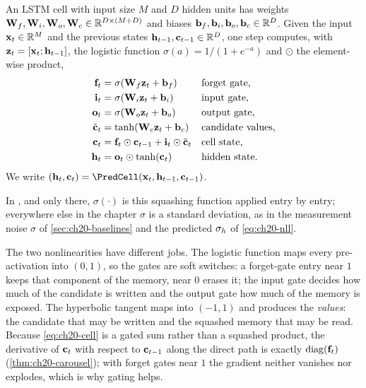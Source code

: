 \begin{definition}
\label{def:ch20-lstm}
An LSTM cell with input size $M$ and $D$ hidden units has weights
$\mathbf{W}_f, \mathbf{W}_i, \mathbf{W}_o, \mathbf{W}_c \in \mathbb{R}^{D \times (M + D)}$ and
biases $\mathbf{b}_f, \mathbf{b}_i, \mathbf{b}_o, \mathbf{b}_c \in \mathbb{R}^D$. Given the
input $\mathbf{x}_t \in \mathbb{R}^M$ and the previous states $\mathbf{h}_{t-1}, \mathbf{c}_{t-1}
\in \mathbb{R}^D$, one step computes, with $\mathbf{z}_t = [\mathbf{x}_t; \mathbf{h}_{t-1}]$,
the logistic function $\sigma(a) = 1/(1 + e^{-a})$ and $\odot$ the
element-wise product,
\begin{align}
  \vect{f}_t &= \sigma(\mat{W}_f \vect{z}_t + \vect{b}_f) && \text{forget gate,}\index{LSTM (long short-term memory)!gates} \label{eq:ch20-forget}\\
  \vect{i}_t &= \sigma(\mat{W}_i \vect{z}_t + \vect{b}_i) && \text{input gate,} \label{eq:ch20-input}\\
  \vect{o}_t &= \sigma(\mat{W}_o \vect{z}_t + \vect{b}_o) && \text{output gate,} \label{eq:ch20-output}\\
  \tilde{\vect{c}}_t &= \tanh(\mat{W}_c \vect{z}_t + \vect{b}_c) && \text{candidate values,} \label{eq:ch20-candidate}\\
  \vect{c}_t &= \vect{f}_t \odot \vect{c}_{t-1} + \vect{i}_t \odot \tilde{\vect{c}}_t && \text{cell state,} \label{eq:ch20-cell}\\
  \vect{h}_t &= \vect{o}_t \odot \tanh(\vect{c}_t) && \text{hidden state.} \label{eq:ch20-hidden}
\end{align}
We write $(\vect{h}_t, \vect{c}_t) = \PredCell(\vect{x}_t, \vect{h}_{t-1}, \vect{c}_{t-1})$.
\end{definition}

In , and only there, $\sigma(\cdot)$
is this squashing function applied entry by entry; everywhere else in the
chapter $\sigma$ is a standard deviation, as in the measurement noise
$\sigma$ of \cref{sec:ch20-baselines} and the predicted $\mathbf{\sigma}_h$ of
\cref{eq:ch20-nll}.

The two nonlinearities have different jobs. The logistic function maps every
pre-activation into $(0, 1)$, so the gates are soft switches: a forget-gate
entry near $1$ keeps that component of the memory, near $0$ erases it; the
input gate decides how much of the candidate is written and the output gate
how much of the memory is exposed. The hyperbolic tangent maps into
$(-1, 1)$ and produces the \emph{values}: the candidate that may be written
and the squashed memory that may be read. Because \cref{eq:ch20-cell} is a
gated sum rather than a squashed product, the derivative of $\mathbf{c}_t$ with
respect to $\mathbf{c}_{t-1}$ along the direct path is exactly
$\operatorname{diag}(\mathbf{f}_t)$ (\cref{thm:ch20-carousel}); with forget gates near $1$ the
gradient neither vanishes nor explodes, which is why gating helps.

